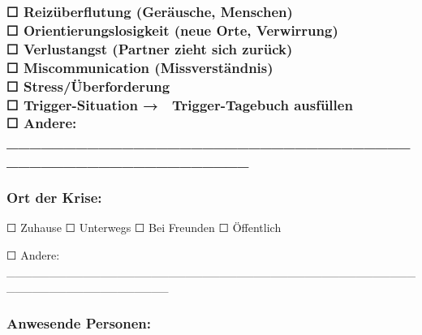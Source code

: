\hypertarget{reizuxfcberflutung-geruxe4usche-menschen-orientierungslosigkeit-neue-orte-verwirrung-verlustangst-partner-zieht-sich-zuruxfcck-miscommunication-missverstuxe4ndnis-stressuxfcberforderung-trigger-situation-trigger-tagebuch-ausfuxfcllen-andere-________________________________________________________}{%
\subsubsection{\texorpdfstring{☐ Reizüberflutung (Geräusche, Menschen)\\
☐ Orientierungslosigkeit (neue Orte, Verwirrung)\\
☐ Verlustangst (Partner zieht sich zurück)\\
☐ Miscommunication (Missverständnis)\\
☐ Stress/Überforderung\\
☐ Trigger-Situation → \textbf{📝 Trigger-Tagebuch ausfüllen}\\
☐ Andere: \_\_\_\_\_\_\_\_\_\_\_\_\_\_\_\_\_\_\_\_\_\_\_\_\_\_\_\_\_\_\_\_\_\_\_\_\_\_\_\_\_\_\_\_\_\_\_\_\_\_\_\_\_\_\_\_}{☐ Reizüberflutung (Geräusche, Menschen) ☐ Orientierungslosigkeit (neue Orte, Verwirrung) ☐ Verlustangst (Partner zieht sich zurück) ☐ Miscommunication (Missverständnis) ☐ Stress/Überforderung ☐ Trigger-Situation → 📝 Trigger-Tagebuch ausfüllen ☐ Andere: \_\_\_\_\_\_\_\_\_\_\_\_\_\_\_\_\_\_\_\_\_\_\_\_\_\_\_\_\_\_\_\_\_\_\_\_\_\_\_\_\_\_\_\_\_\_\_\_\_\_\_\_\_\_\_\_}}\label{reizuxfcberflutung-geruxe4usche-menschen-orientierungslosigkeit-neue-orte-verwirrung-verlustangst-partner-zieht-sich-zuruxfcck-miscommunication-missverstuxe4ndnis-stressuxfcberforderung-trigger-situation-trigger-tagebuch-ausfuxfcllen-andere-________________________________________________________}}

\hypertarget{ort-der-krise}{%
\subsubsection{\texorpdfstring{\textbf{Ort der Krise:}}{Ort der Krise:}}\label{ort-der-krise}}

☐ Zuhause ☐ Unterwegs ☐ Bei Freunden ☐ Öffentlich

☐ Andere: \_\_\_\_\_\_\_\_\_\_\_\_\_\_\_\_\_\_\_\_\_\_\_\_\_\_\_\_\_\_\_\_\_\_\_\_\_\_\_\_\_\_\_\_\_\_\_\_\_\_\_\_\_\_\_\_\_\_\_\_\_\_\_\_\_\_\_

\hypertarget{anwesende-personen}{%
\subsubsection{\texorpdfstring{\textbf{Anwesende Personen:}}{Anwesende Personen:}}\label{anwesende-personen}}

